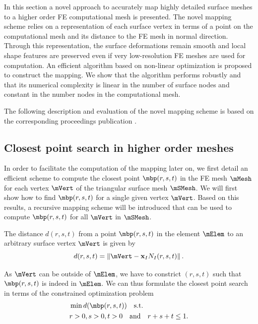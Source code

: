In this section a novel approach to accurately map highly detailed surface meshes to a higher order FE computational mesh is presented. The novel mapping scheme relies on a representation of each surface vertex in terms of a point on the computational mesh and its distance to the FE mesh in normal direction. Through this representation, the surface deformations remain smooth and local shape features are preserved even if very low-resolution FE meshes are used for computation. An efficient algorithm based on non-linear optimization is proposed to construct the mapping. We show that the algorithm performs robustly and that its numerical complexity is linear in the number of surface nodes and constant in the number nodes in the computational mesh.

The following description and evaluation of the novel mapping scheme is based on the corresponding proceedings publication \cite{Suwelack2013}.


\subsection{Closest point search in higher order meshes}

In order to facilitate the computation of the mapping later on, we first detail an efficient scheme to compute the closest point $\mbp (r,s,t)$ in the FE mesh $\mMesh$ for each vertex $\mVert$ of the triangular surface mesh $\mSMesh$. We will first show how to find $\mbp(r,s,t)$ for a single given vertex $\mVert$. Based on this results, a recursive mapping scheme will be introduced that can be used to compute $\mbp(r,s,t)$ for all $\mVert$ in $\mSMesh$.


The distance $d(r,s,t)$ from a point $\mbp(r,s,t)$ in the element $\mElem$ to an arbitrary surface vertex $\mVert$ is given by
\begin{equation}
d(r,s,t) = \left\| \mVert - \mathbf{x}_I N_I(r,s,t) \right\|.
\label{DistanceComputation}
\end{equation}


As $\mVert$ can be outside of $\mElem$, we have to constrict $(r,s,t)$ such that $\mbp(r,s,t)$ is indeed in $\mElem$. We can thus formulate the closest point search in terms of the constrained optimization problem 
\begin{align}
	&\min d(\mbp(r,s,t)) \quad \textnormal{s.t.} \nonumber \\
	&r>0, s>0, t>0 \quad \textnormal{and} \quad r+s+t \leq 1.
	\label{ConstrainedProblem}
\end{align}

